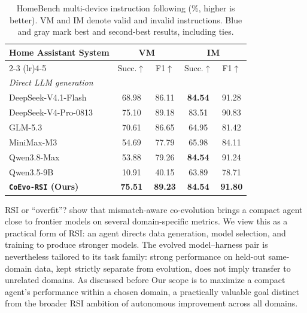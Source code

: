 \documentclass[11pt,a4paper]{article}
\newcommand{\ourmethod}{\texttt{CoEvo-RSI}}
\begin{document}
\begin{table}[!t]
\centering
\footnotesize
\caption{HomeBench multi-device instruction following (\%, higher is better). VM and IM denote valid and invalid instructions. Blue and gray mark best and second-best results, including ties.}

\label{tab:homebench}
\renewcommand{\arraystretch}{1.05}
\setlength{\tabcolsep}{7pt}
\begin{tabular}{lcccc}
\toprule
\multirow{2}{*}{\textbf{Home Assistant System}}
& \multicolumn{2}{c}{\textbf{VM}}
& \multicolumn{2}{c}{\textbf{IM}} \\
\cmidrule(lr){2-3}
\cmidrule(lr){4-5}
& Succ.$\uparrow$ & F1$\uparrow$ & Succ.$\uparrow$ & F1$\uparrow$ \\
\midrule

\multicolumn{5}{l}{\textit{Direct LLM generation}} \\
DeepSeek-V4.1-Flash
& 68.98 & 86.11 & \cellcolor{highlightblue}\textbf{84.54} & \cellcolor{gray!15}91.28 \\
DeepSeek-V4-Pro-0813
& \cellcolor{gray!15}75.10 & \cellcolor{gray!15}89.18 & \cellcolor{gray!15}83.51 & 90.83 \\
GLM-5.3
& 70.61 & 86.65 & 64.95 & 81.42 \\
MiniMax-M3
& 54.69 & 77.79 & 65.98 & 84.11 \\
Qwen3.8-Max
& 53.88 & 79.26 & \cellcolor{highlightblue}\textbf{84.54} & 91.24 \\

\midrule
Qwen3.5-9B
& 10.91 & 40.15 & 63.89 & 78.71 \\
\textbf{\ourmethod{} (Ours)}
& \cellcolor{highlightblue}\textbf{75.51} & \cellcolor{highlightblue}\textbf{89.23} & \cellcolor{highlightblue}\textbf{84.54} & \cellcolor{highlightblue}\textbf{91.80} \\

\bottomrule
\end{tabular}
\end{table}

\begin{insightbox}{RSI or ``overfit''?}
 show that mismatch-aware co-evolution brings a compact agent close to frontier models on several domain-specific metrics.
We view this as a practical form of RSI: an agent directs data generation, model selection, and training to produce stronger models.
The evolved model--harness pair is nevertheless tailored to its task family: strong performance on held-out same-domain data, kept strictly separate from evolution, does not imply transfer to unrelated domains. As discussed before
Our scope is to maximize a compact agent's performance within a chosen domain, a practically valuable goal distinct from the broader RSI ambition of autonomous improvement across all domains.
\end{insightbox}
\end{document}
